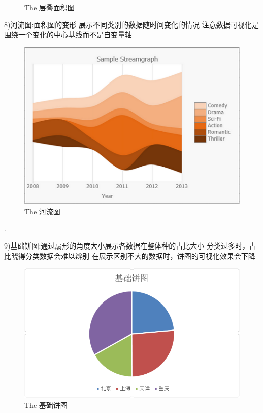 \documentclass{article}
\begin{document}
\begin{itemize}
\begin{figure}[h!]
    		\caption{The 层叠面积图}
    		\label{fig:cengdie}
    		\end{figure}
    		8)河流图:面积图的变形
    		展示不同类别的数据随时间变化的情况
    		注意数据可视化是围绕一个变化的中心基线而不是自变量轴\par
    		\begin{figure}[h!]
    			\centering
    			\includegraphics[scale=0.3]{heliu}
    			\caption{The 河流图}
    			\label{fig:heliu}
    		\end{figure}
    		.\par
    		9)基础饼图:通过扇形的角度大小展示各数据在整体种的占比大小
    		分类过多时，占比晓得分类数据会难以辨别
    		在展示区别不大的数据时，饼图的可视化效果会下降\par
    		\begin{figure}[h!]
    			\centering
    			\includegraphics[scale=0.5]{bingtu}
    			\caption{The 基础饼图}

\end{figure}
\end{itemize}
\end{document}
